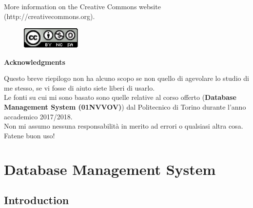 \documentclass[12pt]{article}
\begin{document}
\noindent More information on the Creative Commons website (http://creativecommons.org).

\begin{figure}[h!]
  \centering
  \includegraphics[width=3cm]{images/license.png}
\end{figure}

{\noindent \Large \textbf{Acknowledgments}\bigskip}

Questo breve riepilogo non ha alcuno scopo se non quello di agevolare lo studio di me stesso, se vi fosse di aiuto siete liberi di usarlo.\\
Le fonti su cui mi sono basato sono quelle relative al corso offerto (\textbf{Database Management System (01NVVOV)}) dal Politecnico di Torino durante l'anno accademico 2017/2018.\\
Non mi assumo nessuna responsabilità in merito ad errori o qualsiasi altra cosa. Fatene buon uso!
\newpage

\section{Database Management System}
\subsection{Introduction}
\end{document}
